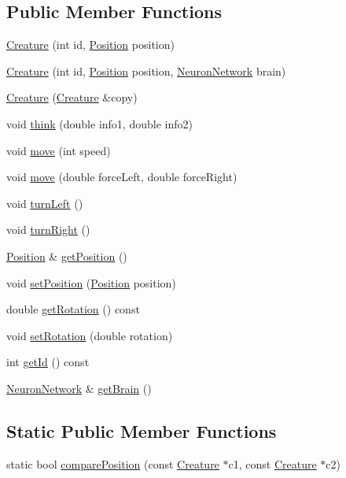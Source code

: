 \subsection*{Public Member Functions}
\begin{DoxyCompactItemize}
\item 
\hyperlink{class_creature_a7275650f280b9b3843a68b6be1e05414}{Creature} (int id, \hyperlink{class_position}{Position} position)
\item 
\hyperlink{class_creature_a25224a54575e8e293eed0b0193e7b129}{Creature} (int id, \hyperlink{class_position}{Position} position, \hyperlink{class_neuron_network}{Neuron\+Network} brain)
\item 
\hyperlink{class_creature_a1d0605314ade7cf62352846d0b4c70b8}{Creature} (\hyperlink{class_creature}{Creature} \&copy)
\item 
void \hyperlink{class_creature_ae0f8589feb089a3991932115003dd3b6}{think} (double info1, double info2)
\item 
void \hyperlink{class_creature_a103c8db13d85ce2b3dba72d04e3e46b1}{move} (int speed)
\item 
void \hyperlink{class_creature_a2b8959e9e3a44d338dc9c6c6f59bda8c}{move} (double force\+Left, double force\+Right)
\item 
void \hyperlink{class_creature_a6775207403a361d6d25f5ee1db58ef94}{turn\+Left} ()
\item 
void \hyperlink{class_creature_a6d10fbf41bcf61c1cddc82400003f1e7}{turn\+Right} ()
\item 
\hyperlink{class_position}{Position} \& \hyperlink{class_creature_ab6608a1d540bbd803e90af7a544176f9}{get\+Position} ()
\item 
void \hyperlink{class_creature_a152a9419a901d998a9f97468c8db44d3}{set\+Position} (\hyperlink{class_position}{Position} position)
\item 
double \hyperlink{class_creature_a46511b5988564d96e92f4f5161965e7b}{get\+Rotation} () const 
\item 
void \hyperlink{class_creature_afcebde8b6b192290b07045c8c1a6887c}{set\+Rotation} (double rotation)
\item 
int \hyperlink{class_creature_a265234eb6ea66408b788b757d96364c0}{get\+Id} () const 
\item 
\hyperlink{class_neuron_network}{Neuron\+Network} \& \hyperlink{class_creature_a594ea524f733bf86373444c4061c535e}{get\+Brain} ()
\end{DoxyCompactItemize}
\subsection*{Static Public Member Functions}
\begin{DoxyCompactItemize}
\item 
static bool \hyperlink{class_creature_a346e9f21aa3f16a444284dd617d19122}{compare\+Position} (const \hyperlink{class_creature}{Creature} $\ast$c1, const \hyperlink{class_creature}{Creature} $\ast$c2)
\end{DoxyCompactItemize}


